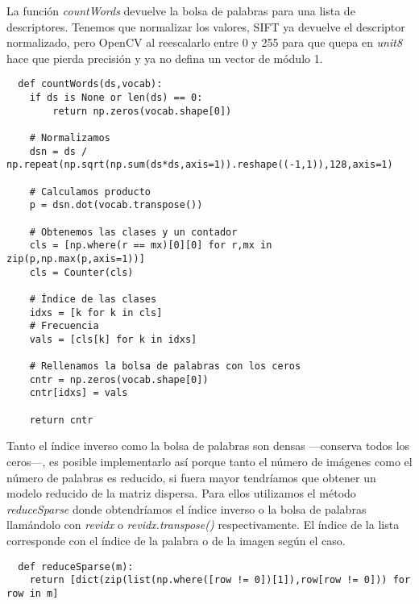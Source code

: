 \documentclass{article}
\begin{document}
La función \textit{countWords} devuelve la bolsa de palabras para una lista de descriptores. Tenemos que normalizar los valores, SIFT ya devuelve el descriptor normalizado, pero OpenCV al reescalarlo entre 0 y 255 para que quepa en \textit{unit8} hace que pierda precisión y ya no defina un vector de módulo 1.

\begin{verbatim}
  def countWords(ds,vocab):
    if ds is None or len(ds) == 0:
        return np.zeros(vocab.shape[0])    
    
    # Normalizamos
    dsn = ds / np.repeat(np.sqrt(np.sum(ds*ds,axis=1)).reshape((-1,1)),128,axis=1)
    
    # Calculamos producto
    p = dsn.dot(vocab.transpose())
    
    # Obtenemos las clases y un contador
    cls = [np.where(r == mx)[0][0] for r,mx in zip(p,np.max(p,axis=1))]
    cls = Counter(cls)

    # Índice de las clases
    idxs = [k for k in cls]
    # Frecuencia
    vals = [cls[k] for k in idxs]

    # Rellenamos la bolsa de palabras con los ceros
    cntr = np.zeros(vocab.shape[0])
    cntr[idxs] = vals

    return cntr
\end{verbatim}


Tanto el índice inverso como la bolsa de palabras son densas ---conserva todos los ceros---, es posible implementarlo así porque tanto el número de imágenes como el número de palabras es reducido, si fuera mayor tendríamos que obtener un modelo reducido de la matriz dispersa. Para ellos utilizamos el método \textit{reduceSparse} donde obtendríamos el índice inverso o la bolsa de palabras llamándolo con \textit{revidx} o \textit{revidx.transpose()} respectivamente. El índice de la lista corresponde con el índice de la palabra o de la imagen según el caso.

\begin{verbatim}
  def reduceSparse(m):
    return [dict(zip(list(np.where([row != 0])[1]),row[row != 0])) for row in m]
\end{verbatim}
\end{document}
